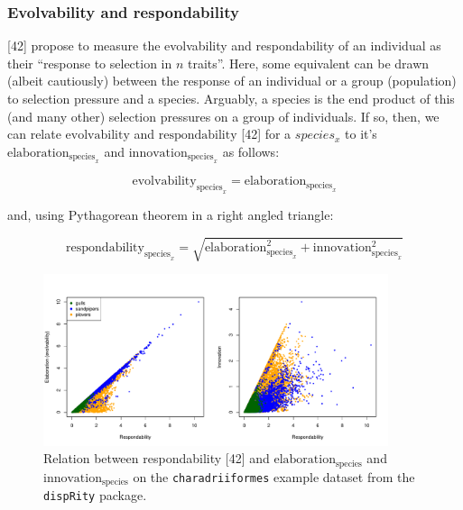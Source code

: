 \documentclass[12pt,a4paper]{article}
\begin{document}
\subsubsection{Evolvability and respondability}

[42] %
propose to measure the evolvability and respondability of an individual as their ``response to selection in $n$ traits''.
Here, some equivalent can be drawn (albeit cautiously) between the response of an individual or a group (population) to selection pressure and a species.
Arguably, a species is the end product of this (and many other) selection pressures on a group of individuals.
If so, then, we can relate $\text{evolvability}$ and $\text{respondability}$ [42] %
for a $species_{x}$ to it's $\text{elaboration}_{\text{species}_{x}}$ and $\text{innovation}_{\text{species}_{x}}$ as follows:

\begin{equation}
\text{evolvability}_{\text{species}_{x}} = \text{elaboration}_{\text{species}_{x}}
\end{equation}

\noindent and, using Pythagorean theorem in a right angled triangle:

\begin{equation}
\text{respondability}_{\text{species}_{x}}  = \sqrt{\text{elaboration}_{\text{species}_{x}}^2 + \text{innovation}_{\text{species}_{x}}^2}
\end{equation}


\begin{figure}[H]
\centering
   \includegraphics[width=0.9\textwidth]{Figures/respondability.pdf}
\caption{Relation between respondability [42] %
and $\text{elaboration}_{\text{species}}$ and $\text{innovation}_{\text{species}}$ on the \texttt{charadriiformes} example dataset from the \texttt{dispRity} package.}
\label{Fig:respondability}
\end{figure}
\end{document}
